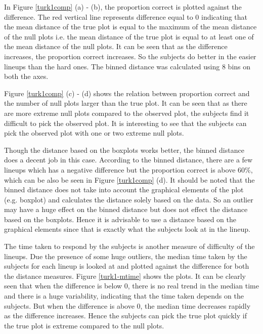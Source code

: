 \documentclass[12]{article}
\begin{document}

In Figure \ref{turk1comp} (a) - (b), the proportion correct is plotted against the difference. The red vertical line represents difference equal to 0 indicating that the mean distance of the true plot is equal to the maximum of the mean distance of the null plots i.e. the mean distance of the true plot is equal to at least one of the mean distance of the null plots. It can be seen that as the difference increases, the proportion correct increases. So the subjects do better in the easier lineups than the hard ones. The binned distance was calculated using 8 bins on both the axes.

Figure \ref{turk1comp} (c) - (d) shows the relation between proportion correct and the number of null plots larger than the true plot. It can be seen that as there are more extreme null plots compared to the observed plot, the subjects find it difficult to pick the observed plot. It is interesting to see that the subjects can pick the observed plot with one or two extreme null plots. 

Though the distance based on the boxplots works better, the binned distance does a decent job in this case. According to the binned distance, there are a few lineups which has a negative difference but the proportion correct is above 60\%, which can be also be seen in Figure \ref{turk1comp} (d). It should be noted that the binned distance does not take into account the graphical elements of the plot (e.g. boxplot) and calculates the distance solely based on the data. So an outlier may have a huge effect on the binned distance but does not effect the distance based on the boxplots. Hence it is advisable to use a distance based on the graphical elements since that is exactly what the subjects look at in the lineup.

The time taken to respond by the subjects is another measure of difficulty of the lineups. Due the presence of some huge outliers, the median time taken by the subjects for each lineup is looked at and plotted against the difference for both the distance measures. Figure \ref{turk1-mtime} shows the plots. It can be clearly seen that when the difference is below 0, there is no real trend in the median time and there is a huge variability, indicating that the time taken depends on the subjects. But when the difference is above 0, the median time decreases rapidly as the difference increases. Hence the subjects can pick the true plot quickly if the true plot is extreme compared to the null plots.
 
\end{document}
